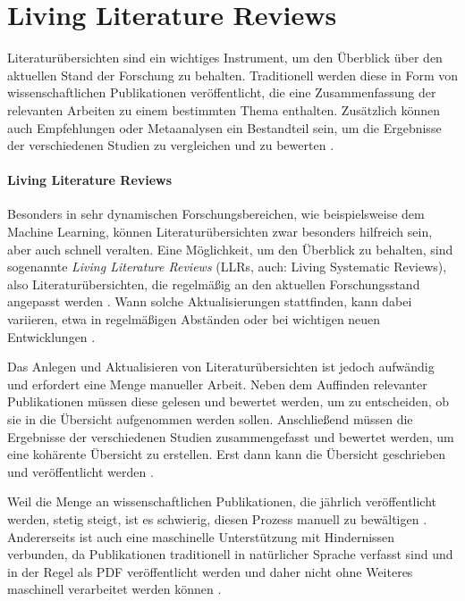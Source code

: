 \section{Living Literature Reviews}
\label{sec:living-literature-reviews}


Literaturübersichten sind ein wichtiges Instrument, um den Überblick über den aktuellen Stand der Forschung zu behalten.
Traditionell werden diese in Form von wissenschaftlichen Publikationen veröffentlicht, die eine Zusammenfassung der relevanten Arbeiten zu einem bestimmten Thema enthalten.
Zusätzlich können auch Empfehlungen oder Metaanalysen ein Bestandteil sein, um die Ergebnisse der verschiedenen Studien zu vergleichen und zu bewerten \cite{elliott2017living}.

\paragraph{Living Literature Reviews}

Besonders in sehr dynamischen Forschungsbereichen, wie beispielsweise dem Machine Learning, können Literaturübersichten zwar besonders hilfreich sein, aber auch schnell veralten.
Eine Möglichkeit, um den Überblick zu behalten, sind sogenannte \textit{Living Literature Reviews} (LLRs, auch: Living Systematic Reviews), also Literaturübersichten, die regelmäßig an den aktuellen Forschungsstand angepasst werden \cite{living-lit-review}.
Wann solche Aktualisierungen stattfinden, kann dabei variieren, etwa in regelmäßigen Abständen oder bei wichtigen neuen Entwicklungen \cite{cochrane}.

Das Anlegen und Aktualisieren von Literaturübersichten ist jedoch aufwändig und erfordert eine Menge manueller Arbeit.
Neben dem Auffinden relevanter Publikationen müssen diese gelesen und bewertet werden, um zu entscheiden, ob sie in die Übersicht aufgenommen werden sollen.
Anschließend müssen die Ergebnisse der verschiedenen Studien zusammengefasst und bewertet werden, um eine kohärente Übersicht zu erstellen.
Erst dann kann die Übersicht geschrieben und veröffentlicht werden \cite{Brack2022}.


Weil die Menge an wissenschaftlichen Publikationen, die jährlich veröffentlicht werden, stetig steigt, ist es schwierig, diesen Prozess manuell zu bewältigen \cite{knowledge-extraction}.
Andererseits ist auch eine maschinelle Unterstützung mit Hindernissen verbunden, da Publikationen traditionell in natürlicher Sprache verfasst sind und in der Regel als PDF veröffentlicht werden und daher nicht ohne Weiteres maschinell verarbeitet werden können \cite{Brack2022}.

